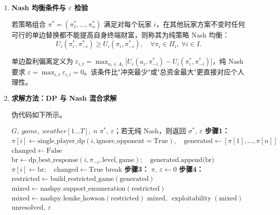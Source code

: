 \documentclass{cumcmthesis}
\numberwithin{equation}{section}
\numberwithin{figure}{section}
\numberwithin{table}{section}
\begin{document}
\begin{enumerate}
    \item \textbf{Nash 均衡条件与 $\varepsilon$ 检验}

\hspace*{2em}若策略组合 $\pi^*=(\pi_1^*,\dots,\pi_n^*)$ 满足对每个玩家 $i$，在其他玩家方案不变时任何可行的单边替换都不能提高自身终端财富，则称其为纯策略 Nash 均衡：
\vspace{-10pt}
\begin{equation}
U_i(\pi_i^*,\pi_{-i}^*)\ge U_i(\pi_i,\pi_{-i}^*),\quad \forall\pi_i\in\Pi_i,\ \forall i\in I.
\end{equation}

\hspace*{2em}单边盈利偏离定义为 $\varepsilon_{i,t}=\max_{a_i\in A_i}\bigl[U_i(a_i,\pi_{-i}^*)-U_i(\pi_i^*,\pi_{-i}^*)\bigr]$，纯 Nash 要求 $\varepsilon=\max_{i,t}\varepsilon_{i,t}=0$。该条件比"冲突最少"或"总资金最大"更直接对应个人理性。

    \item \textbf{求解方法：DP 与 Nash 混合求解}


\hspace*{2em}伪代码如下所示。

\begin{algorithm}[H]
\caption{第五关 DP--Nash 混合求解}
{\small
\begin{algorithmic}[1]
\Require $G,\ game,\ weather[1\ldots T],\ n$
\Ensure $\pi^*,\ \varepsilon$；若无纯 Nash，则返回 $\sigma^*,\ \varepsilon$
\State \textbf{步骤1：} $\pi[i]\leftarrow\text{single\_player\_dp}(i,\mathrm{ignore\_opponent=True}),\quad \text{generated}\leftarrow[\pi[1],\ldots,\pi[n]]$
    \State $\text{changed}\leftarrow\mathrm{False}$
        \State $\mathrm{br}\leftarrow\text{dp\_best\_response}(i,\pi_{-i},\text{level},\text{game});\quad\text{generated.append(br)}$
            \State $\pi[i]\leftarrow\mathrm{br};\quad\text{changed}\leftarrow\mathrm{True}$
        \EndIf
    \EndFor
        \State break
    \EndIf
\EndWhile
\State \textbf{步骤3：} \Return $\pi,\ \varepsilon\leftarrow0$
\State \textbf{步骤4：} $\text{restricted}\leftarrow\text{build\_restricted\_game}(\text{generated})$
\State $\text{mixed}\leftarrow\text{nashpy.support\_enumeration}(\text{restricted})$
    \State $\text{mixed}\leftarrow\text{nashpy.lemke\_howson}(\text{restricted})$
\EndIf
{}
    \State \Return $\text{mixed},\ \operatorname{exploitability}(\text{mixed})$
\EndIf
\State \Return $\text{unresolved},\ \varepsilon$
\end{algorithmic}
}
\label{alg:q31_nash}
\end{algorithm}


\end{enumerate}
\end{document}
